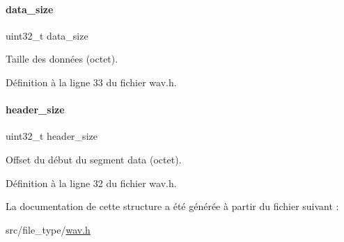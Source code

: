 \paragraph{\texorpdfstring{data\+\_\+size}{data\_size}}
{\footnotesize\ttfamily uint32\+\_\+t data\+\_\+size}

Taille des données (octet). 

Définition à la ligne 33 du fichier wav.\+h.

\mbox{\label{a00178_a841923a20e6dda97c59351c8e97c9be6}} 
\paragraph{\texorpdfstring{header\+\_\+size}{header\_size}}
{\footnotesize\ttfamily uint32\+\_\+t header\+\_\+size}

Offset du début du segment data (octet). 

Définition à la ligne 32 du fichier wav.\+h.



La documentation de cette structure a été générée à partir du fichier suivant \+:\begin{DoxyCompactItemize}
\item 
src/file\+\_\+type/\hyperlink{a00104}{wav.\+h}\end{DoxyCompactItemize}
